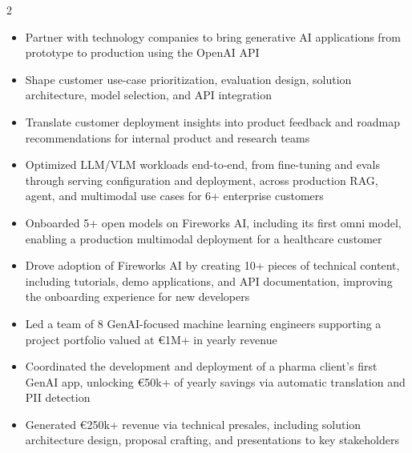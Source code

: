 \documentclass[9.5pt,letterpaper,ragged2e]{altacv}
\newcommand{\resumedivider}{\vspace{-0.12\baselineskip}\textcolor{body!30}{\hdashrule{\linewidth}{0.6pt}{0.5ex}}\vspace{0.18\baselineskip}}
\begin{document}
\begin{paracol}{2}

\vspace{-0.016cm}

\begin{itemize}
\item Partner with technology companies to bring generative AI applications from prototype to production using the OpenAI API
\item Shape customer use-case prioritization, evaluation design, solution architecture, model selection, and API integration
\item Translate customer deployment insights into product feedback and roadmap recommendations for internal product and research teams
\end{itemize}
\resumedivider

\begin{itemize}
\item Optimized LLM/VLM workloads end-to-end, from fine-tuning and evals through serving configuration and deployment, across production RAG, agent, and multimodal use cases for 6+ enterprise customers
\item Onboarded 5+ open models on Fireworks AI, including its first omni model, enabling a production multimodal deployment for a healthcare customer
\item Drove adoption of Fireworks AI by creating 10+ pieces of technical content, including tutorials, demo applications, and API documentation, improving the onboarding experience for new developers
\end{itemize}
\resumedivider

\begin{itemize}
\item Led a team of 8 GenAI-focused machine learning engineers supporting a project portfolio valued at €1M+ in yearly revenue
\item Coordinated the development and deployment of a pharma client's first GenAI app, unlocking €50k+ of yearly savings via automatic translation and PII detection
\item Generated €250k+ revenue via technical presales, including solution architecture design, proposal crafting, and presentations to key stakeholders
\end{itemize}
\resumedivider


\end{paracol}
\end{document}
